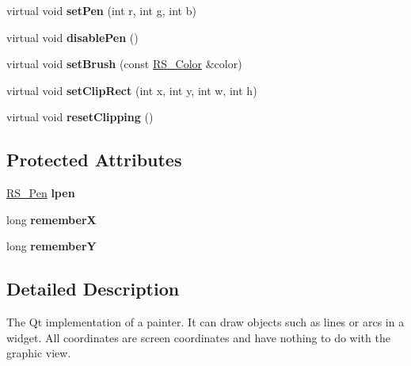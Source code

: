 \begin{DoxyCompactItemize}
\item 
\hypertarget{classRS__PainterQt_a8642191e34f6932e857918dfc5d138d0}{virtual void {\bfseries set\-Pen} (int r, int g, int b)}\label{classRS__PainterQt_a8642191e34f6932e857918dfc5d138d0}

\item 
\hypertarget{classRS__PainterQt_a75786ced7a29f4651b3f4b9b716bdb45}{virtual void {\bfseries disable\-Pen} ()}\label{classRS__PainterQt_a75786ced7a29f4651b3f4b9b716bdb45}

\item 
\hypertarget{classRS__PainterQt_a3cda9d1c6bb79bd9a2ecdcd7a8a26739}{virtual void {\bfseries set\-Brush} (const \hyperlink{classRS__Color}{R\-S\-\_\-\-Color} \&color)}\label{classRS__PainterQt_a3cda9d1c6bb79bd9a2ecdcd7a8a26739}

\item 
\hypertarget{classRS__PainterQt_ae819890cb2ec55a58cfe8706cd506c55}{virtual void {\bfseries set\-Clip\-Rect} (int x, int y, int w, int h)}\label{classRS__PainterQt_ae819890cb2ec55a58cfe8706cd506c55}

\item 
\hypertarget{classRS__PainterQt_aaa76d3710efe1f31ad272298c015f6f6}{virtual void {\bfseries reset\-Clipping} ()}\label{classRS__PainterQt_aaa76d3710efe1f31ad272298c015f6f6}

\end{DoxyCompactItemize}
\subsection*{Protected Attributes}
\begin{DoxyCompactItemize}
\item 
\hypertarget{classRS__PainterQt_a8df8d555a4100a3c20730e5bda8f40fe}{\hyperlink{classRS__Pen}{R\-S\-\_\-\-Pen} {\bfseries lpen}}\label{classRS__PainterQt_a8df8d555a4100a3c20730e5bda8f40fe}

\item 
\hypertarget{classRS__PainterQt_a437058af43b5f91c8fd0cbd9da1948d6}{long {\bfseries remember\-X}}\label{classRS__PainterQt_a437058af43b5f91c8fd0cbd9da1948d6}

\item 
\hypertarget{classRS__PainterQt_a09e5ab330f594399a7298721d481edcd}{long {\bfseries remember\-Y}}\label{classRS__PainterQt_a09e5ab330f594399a7298721d481edcd}

\end{DoxyCompactItemize}


\subsection{Detailed Description}
The Qt implementation of a painter. It can draw objects such as lines or arcs in a widget. All coordinates are screen coordinates and have nothing to do with the graphic view. 

